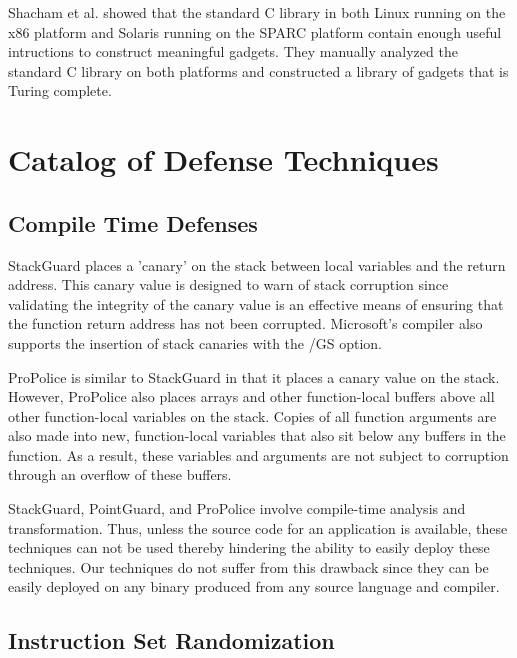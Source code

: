 Shacham et al. \cite{buchanan2008good} showed that the standard C library in both Linux running on the x86 platform and
Solaris running on the SPARC platform contain enough useful intructions to construct meaningful
gadgets. They manually analyzed the standard C library on both platforms and constructed a library
of gadgets that is Turing complete.

\section{Catalog of Defense Techniques}

\subsection{Compile Time Defenses}

StackGuard \cite{stackguard-98} places a 'canary' on the stack between local variables and the
return address. This canary value is designed to warn of stack corruption since validating the
integrity of the canary value is an effective means of ensuring that the function return address has
not been corrupted. Microsoft's compiler also supports the insertion of stack canaries with the /GS
option.

ProPolice \cite{eto2002propolice} is similar to StackGuard in that it places a canary value on the stack. However,
ProPolice also places arrays and other function-local buffers above all other function-local
variables on the stack. Copies of all function arguments are also made into new, function-local
variables that also sit below any buffers in the function. As a result, these variables and
arguments are not subject to corruption through an overflow of these buffers. 

StackGuard, PointGuard, and ProPolice involve compile-time analysis and transformation. Thus, unless
the source code for an application is available, these techniques can not be used thereby hindering
the ability to easily deploy these techniques. Our techniques do not suffer from this drawback since
they can be easily deployed on any binary produced from any source language and compiler.

\subsection{Instruction Set Randomization}

